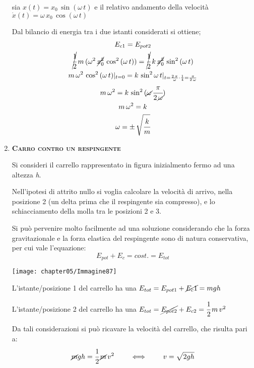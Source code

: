\begin{enumerate}
	 sia $x(t) = x_0\,\sin{(\omega\,t)}$ e il relativo andamento della velocità $\dot{x}(t) = \omega\,x_0\,\cos{(\omega\,t)}$
	
	Dal bilancio di energia tra i due istanti considerati si ottiene;
	\begin{gather*}
	E_{c1} = E_{pot2}\\
	\cancel{\cfrac{1}{2}}\,m\,(\omega^2\,\cancel{x_0^2}\,\cos^2{(\omega\,t)}) = \cancel{\cfrac{1}{2}}\,k\,\cancel{x_0^2}\,\sin^2{(\omega\,t)}\\
	m\,\omega^2\,\cos^2{(\omega\,t)}|_{t = 0}  = k\,\sin^2{\omega\,t}|_{t = \frac{2\,\pi}{\omega}\cdot\frac{1}{4}=\frac{\pi}{2\,\omega}} \\
	m\,\omega^2 = k\,\sin^2{(\cancel{\omega}\,\cfrac{\pi}{2\,\cancel{\omega}})}\\
	m\,\omega^2 = k\\
	\omega= \pm\,\sqrt{\cfrac{k}{m}}
	\end{gather*}

	\item {\scshape{\bfseries Carro contro un respingente}}

Si consideri il carrello rappresentato in figura inizialmento fermo ad una altezza \emph{h}.

	\begin{minipage}{.5\textwidth}
	
	 Nell'ipotesi di attrito nullo si voglia calcolare la velocità di arrivo, nella posizione 2 (un delta prima che il respingente sia compresso), e lo schiacciamento della molla tra le posizioni 2 e 3.
	 
	 Si può pervenire molto facilmente ad una soluzione considerando che la forza gravitazionale e la forza elastica del respingente sono di natura conservativa, per cui vale l'equazione:
	 \[E_{pot} + E_c = cost. = E_{tot}\]
	\end{minipage}
	\hfill
	\begin{minipage}{.5\textwidth}
	\centering
	\texttt{[image: chapter05/Immagine87]}
	\end{minipage}

	L'istante/posizione 1 del carrello ha una $E_{tot} = E_{pot1}+ \cancel{E_c1} = mgh$
	
	L'istante/posizione 2 del carrello ha una $E_{tot} = \cancel{E_{pot2}} + E_{c2} = \cfrac{1}{2}\,m\,v^2$
	
	Da tali considerazioni si può ricavare la velocità del carrello, che risulta pari a:
	\begin{gather*}
	\cancel{m}gh = \cfrac{1}{2}\,\cancel{m}\,v^2\qquad\iff\qquad v = \sqrt{2gh}
	\end{gather*}
	

\end{enumerate}
